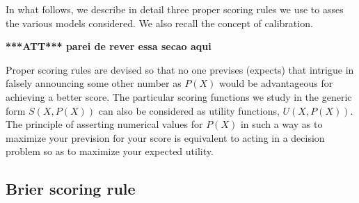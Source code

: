 \documentclass[journal,article,accept,moreauthors,pdftex,12pt,a4paper]{mdpi}
\newcommand{\red}[1]{\textbf{\color{red} ***ATT*** #1}}
\begin{document}
In what follows, we describe in detail three proper scoring rules we use to asses the various models considered. 
We also recall the concept of calibration.

\red{parei de rever essa secao aqui}

Proper scoring rules are devised so that no one previses (expects) that intrigue in falsely announcing some other number as $P(X)$ would be advantageous for achieving a better score.
The particular scoring functions we study in the generic form $S(X,P(X))$ can also be considered as utility functions, $U(X,P(X))$.
The principle of asserting numerical values for $P(X)$ in such a way as to maximize your prevision for your score is equivalent to acting in a decision problem so as to maximize your expected utility.



\subsection{Brier scoring rule}
\end{document}
